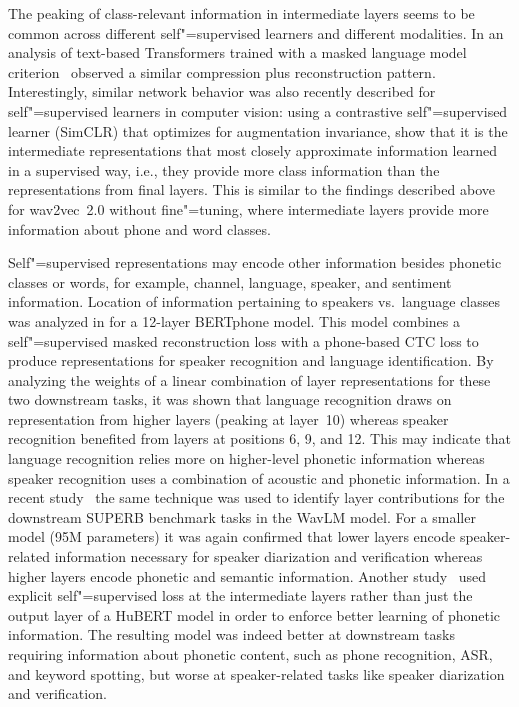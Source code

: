 The peaking of class-relevant information in intermediate layers seems to be
common across different self"=supervised learners and different modalities. In
an analysis of text-based Transformers trained with a masked language model
criterion~\parencite{voita_bottomup_2019} observed a similar compression plus reconstruction
pattern. Interestingly, similar network behavior was also recently described
for self"=supervised learners in computer vision: using a contrastive
self"=supervised learner (SimCLR) that optimizes for augmentation invariance,
\parencite{grigg_selfsupervised_2021} show that it is the intermediate representations that most
closely approximate information learned in a supervised way, i.e., they
provide more class information than the representations from final layers. This
is similar to the findings described above for wav2vec~2.0 without fine"=tuning,
where intermediate layers provide more information about phone and word
classes.

Self"=supervised representations may encode other information besides phonetic
classes or words, for example, channel, language, speaker, and sentiment
information. 
Location of information pertaining to speakers vs.\ language classes was
analyzed in \parencite{ling_bertphone_2020} for a 12-layer BERTphone model. This model
combines a self"=supervised masked reconstruction loss with a phone-based CTC
loss to produce representations	for speaker recognition and language
identification. By	analyzing the weights	of a linear combination	of layer
representations for these two downstream tasks, it was	shown that language
recognition draws on representation	from higher layers (peaking at layer~10)
whereas speaker recognition benefited from layers at positions 6, 9, and 12.
This may indicate that language recognition relies more on higher-level
phonetic information whereas speaker recognition uses a combination of
acoustic and phonetic information. In a recent study~\parencite{chen_wavlm_2021} the
same technique was used to identify layer contributions for the downstream
SUPERB benchmark tasks in the WavLM model. For a smaller model (95M parameters)
it was again confirmed that lower layers encode speaker-related information
necessary for speaker diarization and verification whereas higher layers encode
phonetic and semantic information. Another study~\parencite{wang_selfsupervised_2021} used
explicit self"=supervised loss at the intermediate layers rather than just the
output layer of a HuBERT model in order to enforce better learning of phonetic
information. The resulting model was indeed better at downstream tasks
requiring information about phonetic content, such as phone recognition, ASR,
and keyword spotting, but worse at speaker-related tasks like speaker
diarization and verification. 

